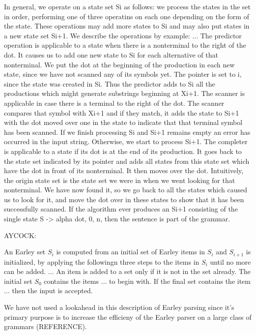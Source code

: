 \begin{isabellebody}
\begin{isamarkuptext}
In general, we operate on a state set Si as follows:
we process the states in the set in order, performing one of three operatins on each one depending on the form
of the state. These operations may add more states to Si and may also put states in a new state set Si+1. We
describe the operations by example: ... The predictor operation is applicable to a state when there is a nonterminal
to  the right of the dot. It causes us to add one new state to Si for each alternative of that nonterminal.
We put the dot at the beginning of the production in each new state, since we have not scanned any of its symbols yet.
The pointer is set to i, since the state was created in Si. Thus the predictor adds to Si all the productions
which might generate substrings beginning at Xi+1. The scanner is applicable in case there is a terminal to the right
of the dot. The scanner compares that symbol with Xi+1 and if they match, it adds the state to Si+1 with the dot
moved over one in the state to indicate that that terminal symbol has been scanned. If we finish processing Si and
Si+1 remains empty an error has occurred in the input string. Otherwise, we start to process Si+1.
The completer is applicable to a state if its dot is at the end of its production. It goes back to the state set
indicated by its pointer and adds all states from this state set which have the dot in front of its nonterminal.
It then moves over the dot. Intuitively, the origin state set is the state set we were in when we went looking
for that nonterminal. We have now found it, so we go back to all the states which caused us to look for it, and move
the dot over in these states to show that it has been successfully scanned. If the algorithm ever produces an Si+1
consisting of the single state S -> alpha dot, 0, n, then the sentence is part of the grammar.

AYCOCK:

An Earley set $S_i$ is computed from an initial set of Earley items in $S_i$ and $S_{i+1}$ is initialized, by
applying the followingn three steps to the items in $S_i$ until no more can be added. $\dots$
An item is added to a set only if it is not in the set already. The initial set $S_0$ contains the items $\dots$
to begin with. If the final set contains the item $\dots$ then the input is accepted.

We have not used a lookahead in this description of Earley parsing since it's primary purpose is to
increase the efficieny of the Earley parser on a large class of grammars (REFERENCE).%
\end{isamarkuptext}\isamarkuptrue%
%
\begin{isamarkuptext}%
\begin{figure}[htpb]
    \centering


\end{figure}
\end{isamarkuptext}
\end{isabellebody}
